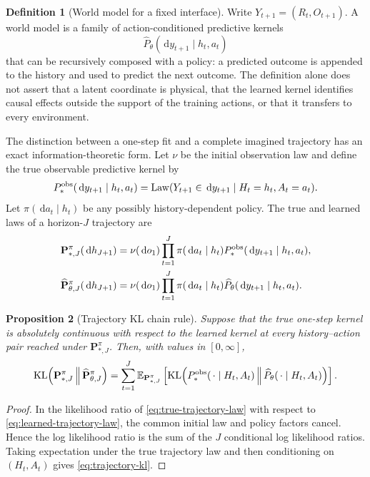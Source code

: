 \documentclass[11pt]{amsart}
\numberwithin{equation}{section}
\theoremstyle{definition}
\newtheorem{definition}{Definition}[section]
\theoremstyle{plain}
\newtheorem{proposition}[definition]{Proposition}
\theoremstyle{remark}
\newcommand{\E}{\mathbb{E}}
\newcommand{\dd}{\,\mathrm{d}}
\DeclareMathOperator{\KL}{KL}
\begin{document}
\begin{definition}[World model for a fixed interface]
\label{def:world-model}
Write $Y_{t+1}=(R_t,O_{t+1})$.  A world model is a family of
action-conditioned predictive kernels
\[
 \widehat P_\theta(\dd y_{t+1}\mid h_t,a_t)
\]
that can be recursively composed with a policy: a predicted outcome is
appended to the history and used to predict the next outcome.  The definition
alone does not assert that a latent coordinate is physical, that the learned
kernel identifies causal effects outside the support of the training actions,
or that it transfers to every environment.
\end{definition}

The distinction between a one-step fit and a complete imagined trajectory has
an exact information-theoretic form.  Let $\nu$ be the initial observation law
and define the true observable predictive kernel by
\[
 P_*^{\rm obs}(\dd y_{t+1}\mid h_t,a_t)
 =\operatorname{Law}(Y_{t+1}\in\dd y_{t+1}\mid H_t=h_t,A_t=a_t).
\]
Let $\pi(\dd a_t\mid h_t)$ be any possibly history-dependent policy.  The
true and learned laws of a horizon-$J$ trajectory are
\begin{align}
 \mathbf P_{*,J}^{\pi}(\dd h_{J+1})
 &=\nu(\dd o_1)\prod_{t=1}^J
   \pi(\dd a_t\mid h_t)P_*^{\rm obs}(\dd y_{t+1}\mid h_t,a_t),
 \label{eq:true-trajectory-law}\\
 \widehat{\mathbf P}_{\theta,J}^{\pi}(\dd h_{J+1})
 &=\nu(\dd o_1)\prod_{t=1}^J
   \pi(\dd a_t\mid h_t)\widehat P_\theta
   (\dd y_{t+1}\mid h_t,a_t).
 \label{eq:learned-trajectory-law}
\end{align}

\begin{proposition}[Trajectory KL chain rule]
\label{prop:trajectory-kl}
Suppose that the true one-step kernel is absolutely continuous with respect to
the learned kernel at every history--action pair reached under
$\mathbf P_{*,J}^{\pi}$.  Then, with values in $[0,\infty]$,
\begin{equation}\label{eq:trajectory-kl}
 \KL\!\left(
   \mathbf P_{*,J}^{\pi}
   \,\middle\|\,
   \widehat{\mathbf P}_{\theta,J}^{\pi}
 \right)
 =\sum_{t=1}^J
  \E_{\mathbf P_{*,J}^{\pi}}
  \left[
   \KL\!\left(
    P_*^{\rm obs}(\,\cdot\mid H_t,A_t)
    \,\middle\|\,
    \widehat P_\theta(\,\cdot\mid H_t,A_t)
   \right)
  \right].
\end{equation}
\end{proposition}

\begin{proof}
In the likelihood ratio of
\eqref{eq:true-trajectory-law} with respect to
\eqref{eq:learned-trajectory-law}, the common initial law and policy factors
cancel.  Hence the log likelihood ratio is the sum of the $J$ conditional log
likelihood ratios.  Taking expectation under the true trajectory law and then
conditioning on $(H_t,A_t)$ gives \eqref{eq:trajectory-kl}.
\end{proof}
\end{document}
